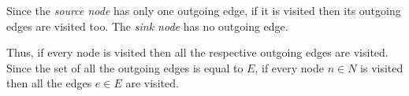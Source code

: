 Since the \emph{source node} has only one outgoing edge, if it is visited then its outgoing edges are visited too. The \emph{sink node} has no outgoing edge.

Thus, if every node is visited then all the respective outgoing edges are visited. Since the set of all the outgoing edges is equal to $E$, if every node $n \in N$ is visited then all the edges $e \in E$ are visited.



 